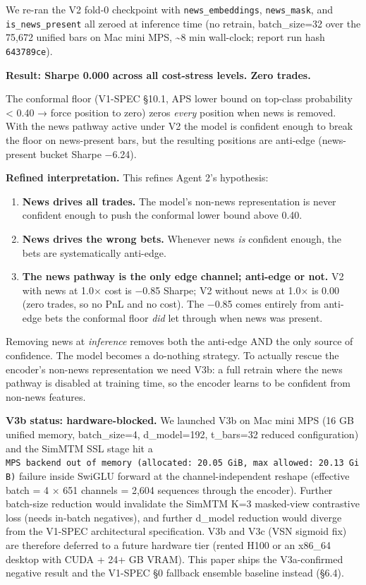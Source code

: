 \documentclass[
]{article}
\providecommand{\tightlist}{%
  \setlength{\itemsep}{0pt}\setlength{\parskip}{0pt}}
\begin{document}
We re-ran the V2 fold-0 checkpoint with \texttt{news\_embeddings},
\texttt{news\_mask}, and \texttt{is\_news\_present} all zeroed at
inference time (no retrain, batch\_size=32 over the 75,672 unified bars
on Mac mini MPS, \textasciitilde8 min wall-clock; report run hash
\texttt{643789ce}).

\textbf{Result: Sharpe 0.000 across all cost-stress levels. Zero
trades.}

The conformal floor (V1-SPEC §10.1, APS lower bound on top-class
probability \textless{} 0.40 → force position to zero) zeros
\emph{every} position when news is removed. With the news pathway active
under V2 the model is confident enough to break the floor on
news-present bars, but the resulting positions are anti-edge
(news-present bucket Sharpe −6.24).

\textbf{Refined interpretation.} This refines Agent 2's hypothesis:

\begin{enumerate}
\def\labelenumi{\arabic{enumi}.}
\tightlist
\item
  \textbf{News drives all trades.} The model's non-news representation
  is never confident enough to push the conformal lower bound above
  0.40.
\item
  \textbf{News drives the wrong bets.} Whenever news \emph{is} confident
  enough, the bets are systematically anti-edge.
\item
  \textbf{The news pathway is the only edge channel; anti-edge or not.}
  V2 with news at 1.0× cost is −0.85 Sharpe; V2 without news at 1.0× is
  0.00 (zero trades, so no PnL and no cost). The −0.85 comes entirely
  from anti-edge bets the conformal floor \emph{did} let through when
  news was present.
\end{enumerate}

Removing news at \emph{inference} removes both the anti-edge AND the
only source of confidence. The model becomes a do-nothing strategy. To
actually rescue the encoder's non-news representation we need V3b: a
full retrain where the news pathway is disabled at training time, so the
encoder learns to be confident from non-news features.

\textbf{V3b status: hardware-blocked.} We launched V3b on Mac mini MPS
(16 GB unified memory, batch\_size=4, d\_model=192, t\_bars=32 reduced
configuration) and the SimMTM SSL stage hit a
\texttt{MPS\ backend\ out\ of\ memory\ (allocated:\ 20.05\ GiB,\ max\ allowed:\ 20.13\ GiB)}
failure inside SwiGLU forward at the channel-independent reshape
(effective batch = 4 × 651 channels = 2,604 sequences through the
encoder). Further batch-size reduction would invalidate the SimMTM K=3
masked-view contrastive loss (needs in-batch negatives), and further
d\_model reduction would diverge from the V1-SPEC architectural
specification. V3b and V3c (VSN sigmoid fix) are therefore deferred to a
future hardware tier (rented H100 or an x86\_64 desktop with CUDA + 24+
GB VRAM). This paper ships the V3a-confirmed negative result and the
V1-SPEC §0 fallback ensemble baseline instead (§6.4).
\end{document}
